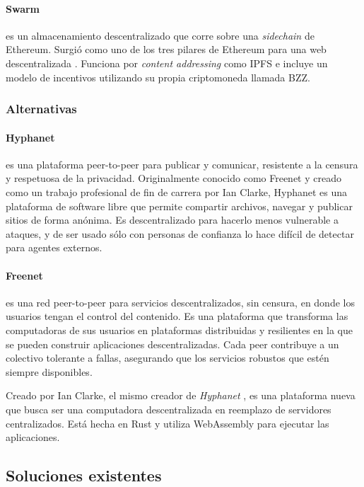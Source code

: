 \paragraph{Swarm} \cite{team2021swarm} es un almacenamiento descentralizado que corre sobre una \textit{sidechain} de Ethereum. Surgió como uno de los tres pilares de Ethereum para una web descentralizada \parencite{swarm-origin}. Funciona por \textit{content addressing} como IPFS e incluye un modelo de incentivos utilizando su propia criptomoneda llamada BZZ.

\subsubsection{Alternativas}
\paragraph{Hyphanet} \cite{hyphanet-white-paper} \cite{hyphanet} es una plataforma peer-to-peer para publicar y comunicar, resistente a la censura y respetuosa de la privacidad. Originalmente conocido como Freenet y creado como un trabajo profesional de fin de carrera por Ian Clarke, Hyphanet es una plataforma de software libre que permite compartir archivos, navegar y publicar sitios de forma anónima. Es descentralizado para hacerlo menos vulnerable a ataques, y de ser usado sólo con personas de confianza lo hace difícil de detectar para agentes externos.

\paragraph{Freenet} \cite{freenet} es una red peer-to-peer para servicios descentralizados, sin censura, en donde los usuarios tengan el control del contenido. Es una plataforma que transforma las computadoras de sus usuarios en plataformas distribuidas y resilientes en la que se pueden construir aplicaciones descentralizadas. Cada peer contribuye a un colectivo tolerante a fallas, asegurando que los servicios robustos que estén siempre disponibles.

Creado por Ian Clarke, el mismo creador de \textit{Hyphanet} \cite{hyphanet}, es una plataforma nueva que busca ser una computadora descentralizada en reemplazo de servidores centralizados. Está hecha en Rust y utiliza WebAssembly para ejecutar las aplicaciones.


\subsection{Soluciones existentes}


